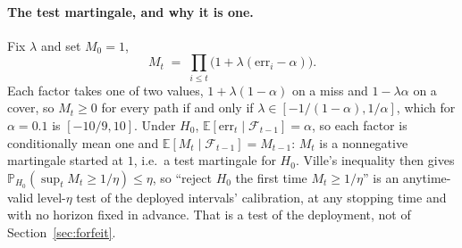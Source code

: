 \paragraph{The test martingale, and why it is one.} Fix $\lambda$ and set $M_0 = 1$,
\[
  M_t \;=\; \prod_{i \le t}\big(1 + \lambda(\mathrm{err}_i - \alpha)\big) .
\]
Each factor takes one of two values, $1 + \lambda(1-\alpha)$ on a miss and $1 - \lambda\alpha$ on a
cover, so $M_t \ge 0$ for every path if and only if $\lambda \in [-1/(1-\alpha), 1/\alpha]$, which
for $\alpha = 0.1$ is $[-10/9, 10]$. Under $H_0$, $\mathbb{E}[\mathrm{err}_t \mid
\mathcal{F}_{t-1}] = \alpha$, so each factor is conditionally mean one and $\mathbb{E}[M_t \mid
\mathcal{F}_{t-1}] = M_{t-1}$: $M_t$ is a nonnegative martingale started at $1$, i.e.\ a test
martingale for $H_0$. Ville's inequality then gives $\mathbb{P}_{H_0}(\sup_t M_t \ge 1/\eta) \le
\eta$, so ``reject $H_0$ the first time $M_t \ge 1/\eta$'' is an anytime-valid level-$\eta$ test of
the deployed intervals' calibration, at any stopping time and with no horizon fixed in advance.
That is a test of the deployment, not of Section~\ref{sec:forfeit}.

